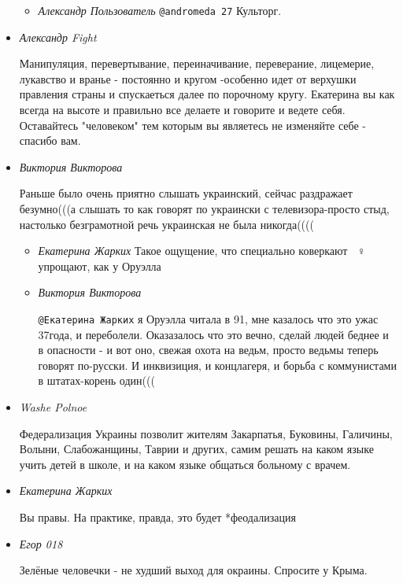 \begin{itemize}
\begin{itemize}
\item \emph{Александр Пользователь}
\verb|@andromeda 27|  Культорг.
\end{itemize}

\item \emph{Александр Fight}

Манипуляция, перевертывание, переиначивание, переверание, лицемерие, лукавство
и вранье - постоянно и кругом -особенно идет от верхушки правления страны и
спускаеться далее по порочному кругу. Екатерина вы как всегда на высоте и
правильно все делаете и говорите и ведете себя. Оставайтесь "человеком" тем
которым вы являетесь не изменяйте себе - спасибо вам.

\item \emph{Виктория Викторова}

Раньше было очень приятно слышать украинский, сейчас раздражает безумно(((а
слышать то как говорят по украински с телевизора-просто стыд, настолько
безграмотной речь украинская не была никогда((((

\begin{itemize}
\item \emph{Екатерина Жарких}
Такое ощущение, что специально коверкают 🤷🏼♀️ упрощают, как у Оруэлла

\item \emph{Виктория Викторова}

\verb|@Екатерина Жарких|  я Оруэлла читала в 91, мне казалось что это ужас
37года, и переболели. Оказазалось что это вечно, сделай людей беднее и в
опасности - и вот оно, свежая охота на ведьм, просто ведьмы теперь говорят
по-русски. И инквизиция, и концлагеря, и борьба с коммунистами в штатах-корень
один(((

\end{itemize}

\item \emph{Washe Polnoe}

Федерализация Украины позволит жителям Закарпатья, Буковины, Галичины, Волыни,
Слабожанщины, Таврии и других, самим решать на каком языке учить детей в школе,
и на каком языке общаться больному с врачем.

\item \emph{Екатерина Жарких}

Вы правы. На практике, правда, это будет *феодализация

\item \emph{Егор 018}

Зелёные человечки - не худший выход для окраины. Спросите у Крыма.


\end{itemize}
